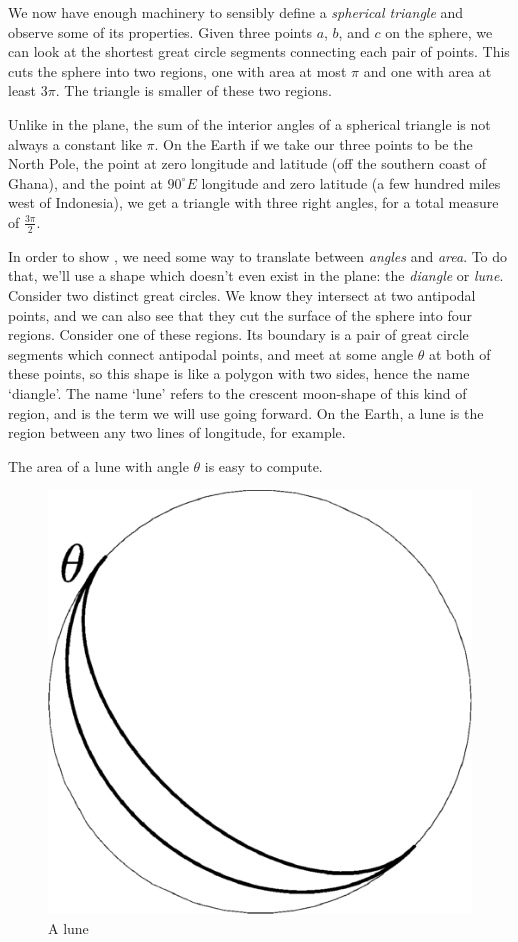 We now have enough machinery to sensibly define a \textit{spherical triangle} and observe some of its properties. Given three points $a$, $b$, and $c$ on the sphere, we can look at the shortest great circle segments connecting each pair of points.  This cuts the sphere into two regions, one with area at most $\pi$ and one with area at least $3\pi$.  The triangle is smaller of these two regions.


Unlike in the plane, the sum of the interior angles of a spherical triangle is not always a constant like $\pi$.  On the Earth if we take our three points to be the North Pole, the point at zero longitude and latitude (off the southern coast of Ghana), and the point at $90^\circ E$ longitude and zero latitude (a few hundred miles west of Indonesia), we get a triangle with three right angles, for a total measure of $\tfrac{3\pi}{2}$.



In order to  show , we need some way to translate between \textit{angles} and \textit{area}.  To do that, we'll use a shape which doesn't even exist in the plane: the \textit{diangle} or \textit{lune}.  Consider two distinct great circles.  We know they intersect at two antipodal points, and we can also see that they cut the surface of the sphere into four regions.  Consider one of these regions.  Its boundary is a pair of great circle segments which connect antipodal points, and meet at some angle $\theta$ at both of these points, so this shape is like a polygon with two sides, hence the name `diangle'.  The name `lune' refers to the crescent moon-shape of this kind of region, and is the term we will use going forward.  On the Earth, a lune is the region between any two lines of longitude, for example.

The area of a lune with angle $\theta$ is easy to compute.


\begin{figure}[htb]
	\centering
	\includegraphics[width=.35\textwidth]{figs/lune.pdf}
	\caption{A lune }
	\label{fig:lune}
\end{figure}

